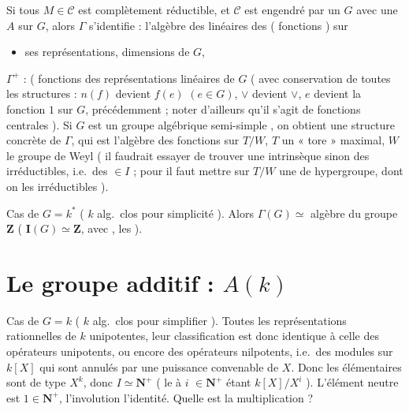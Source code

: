 \documentclass[11pt,a4paper]{article}
\begin{document}
Si tous $M \in \mathcal{C}$ est complètement réductible, et $\mathcal{C}$ est
engendré par un \struck{\ill{}} $G$ avec une  $A$ sur $G$,
alors $\Gamma$ s'identifie : l'algèbre des \struck{\ill{}}
 linéaires des \ill{} ( fonctions ) sur

\begin{itemize}
\item[a)] ses représentations, dimensions de $G$,
\end{itemize}

$\Gamma^{+}$ :  \struck{\ill{}} ( fonctions des
représentations linéaires de $G$ ( avec conservation de toutes les structures :
$n(f)$ devient $f(e)$ $(e \in G)$, $\vee$ devient $\vee$, $e$ devient la
fonction $1$ sur $G$, \ill{} précédemment ; noter d'ailleurs qu'il s'agit de
fonctions centrales ). Si  $G$ est un groupe algébrique
semi-simple \ill{} \ill{}, on obtient une \ill{} structure concrète de $\Gamma$,
qui est l'algèbre des fonctions \ill{} sur $T/W$, $T$ un « tore » maximal, $W$
le groupe de Weyl ( il faudrait essayer de trouver une \ill{} intrinsèque sinon
des \ill{} irréductibles, i.e.\ des \ill{} $\in I$ ; pour \ill{} il faut mettre
sur $T/W$ une \ill{} de hypergroupe, dont on \ill{}  les
\ill{} irréductibles ).

Cas de $G = k^{*}$ ( $k$ alg.\ clos pour simplicité ). Alors $\Gamma(G) \simeq$
algèbre du groupe $\mathbf{Z}$ ( $\mathbf{I}(G) \simeq \mathbf{Z}$, avec \ill{},
les \ill{} ).

\section*{Le groupe additif : $A(k)$}




Cas de $G = k$ ( $k$ alg.\ clos pour simplifier ). Toutes les représentations
rationnelles de $k$  unipotentes, leur classification est donc
identique à celle des opérateurs unipotents, ou encore des opérateurs
nilpotents, i.e.\ des modules sur $k[X]$ qui sont annulés par une puissance
convenable de $X$. Donc les  élémentaires sont de type $X^{k}$,
donc $I \simeq \mathbf{N}^{+}$ ( le \ill{} à $i$ \ill{} $\in \mathbf{N}^{+}$
étant $k[X]/X^{i}$ ). L'élément neutre est $1 \in \mathbf{N}^{+}$, l'involution
l'identité. Quelle est la multiplication ?
\end{document}
